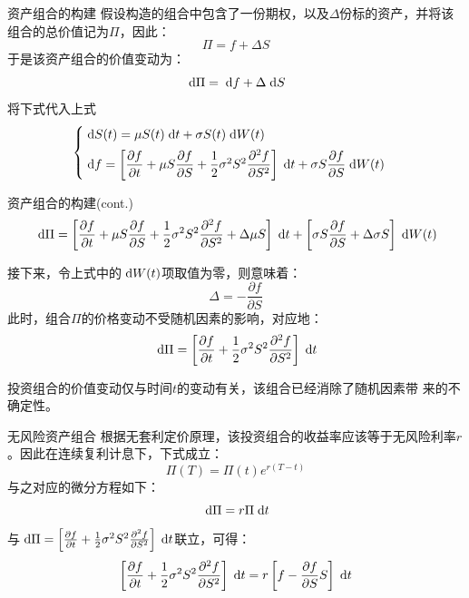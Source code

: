 \documentclass[t]{beamer}
\newcommand{\dif}{{\;\rm d}}
\begin{document}
\begin{frame}{资产组合的构建}
假设构造的组合中包含了一份期权，以及$\Delta$份标的资产，并将该组合的总价值记为$\Pi$，因此：
\begin{equation*}
\Pi=f+\Delta S
\end{equation*}
于是该资产组合的价值变动为：
\begin{equation*}
\dif \Pi=\dif f+\Delta \dif S
\end{equation*}
将下式代入上式
\[\begin{cases}
\vspace{1ex}\dif S(t)=\mu S(t)\dif t+\sigma S(t)\dif W(t)\\
\dif f=\left[\dfrac{\partial f}{\partial t}+\mu S\dfrac{\partial f}{\partial S}+\dfrac{1}{2}\sigma^2S^2\dfrac{\partial^2 f}{\partial S^2} \right]\dif t+\sigma S\dfrac{\partial f}{\partial S}\dif W(t)
\end{cases}\]
\end{frame}

\begin{frame}{资产组合的构建(cont.)}
\begin{equation*}
\dif \Pi=\left[\frac{\partial f}{\partial t}+\mu S\frac{\partial f}{\partial S}+\frac{1}{2}\sigma^2S^2\frac{\partial^2 f}{\partial S^2}+\Delta\mu S \right]\dif t+\left[\sigma S\frac{\partial f}{\partial S}+\Delta\sigma S\right]\dif W(t)
\end{equation*}

接下来，令上式中的$\dif W(t)$项取值为零，则意味着：
\[\Delta=-\frac{\partial f}{\partial S}  \]
此时，组合$\Pi$的价格变动不受随机因素的影响，对应地：
\begin{equation*}
\dif \Pi=\left[\frac{\partial f}{\partial t}+\frac{1}{2}\sigma^2S^2\frac{\partial^2 f}{\partial S^2} \right]\dif t
\end{equation*}

{\color{red}投资组合的价值变动仅与时间$t$的变动有关，该组合已经消除了随机因素带
来的不确定性。}
\end{frame}

\begin{frame}{无风险资产组合}
根据无套利定价原理，该投资组合的收益率应该等于无风险利率$r$。因此在连续复利计息下，下式成立：
\[\Pi(T)=\Pi(t)e^{r(T-t)} \]
与之对应的微分方程如下：
\begin{equation*}
\dif \Pi=r\Pi \dif t
\end{equation*}
与$\dif \Pi=\left[\frac{\partial f}{\partial t}+\frac{1}{2}\sigma^2S^2\frac{\partial^2 f}{\partial S^2} \right]\dif t$联立，可得：
\[\left[\frac{\partial f}{\partial t}+\frac{1}{2}\sigma^2S^2\frac{\partial^2 f}{\partial S^2} \right]\dif t=r\left[f-\frac{\partial f}{\partial S} S\right]\dif t \]
\end{frame}
\end{document}
